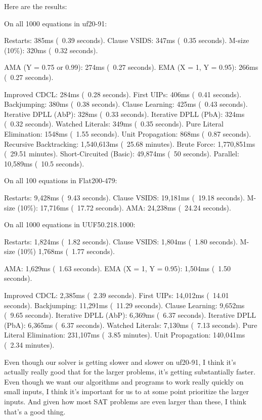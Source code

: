 \documentclass[../main.tex]{subfiles}
\begin{document}
Here are the results:
\begin{FVerbatim}
On all 1000 equations in uf20-91:

Restarts:                   385ms (~0.39 seconds).
Clause VSIDS:               347ms (~0.35 seconds).
M-size (10\%):              320ms (~0.32 seconds).

AMA (Y = 0.75 or 0.99):     274ms (~0.27 seconds).
EMA (X = 1, Y = 0.95):      266ms (~0.27 seconds).

Improved CDCL:              284ms (~0.28 seconds).
First UIPs:                 406ms (~0.41 seconds).
Backjumping:                380ms (~0.38 seconds).
Clause Learning:            425ms (~0.43 seconds).
Iterative DPLL (AbP):       328ms (~0.33 seconds).
Iterative DPLL (PbA):       324ms (~0.32 seconds).
Watched Literals:           349ms (~0.35 seconds).
Pure Literal Elimination:   1548ms (~1.55 seconds).
Unit Propagation:           868ms (~0.87 seconds).
Recursive Backtracking:     1,540,613ms (~25.68 minutes).
Brute Force:                1,770,851ms (~29.51 minutes).
Short-Circuited (Basic):    49,874ms (~50 seconds).
Parallel:                   10,589ms (~10.5 seconds).

On all 100 equations in Flat200-479:

Restarts:                   9,428ms  (~9.43 seconds).
Clause VSIDS:               19,181ms (~19.18 seconds).
M-size (10\%):              17,716ms (~17.72 seconds).
AMA:                        24,238ms (~24.24 seconds).

On all 1000 equations in UUF50.218.1000:

Restarts:                   1,824ms (~1.82 seconds).
Clause VSIDS:               1,804ms (~1.80 seconds).
M-size (10\%)               1,768ms (~1.77 seconds).

AMA:                        1,629ms (~1.63 seconds).
EMA (X = 1, Y = 0.95):      1,504ms (~1.50 seconds).

Improved CDCL:              2,385ms (~2.39 seconds).
First UIPs:                 14,012ms (~14.01 seconds).
Backjumping:                11,291ms (~11.29 seconds).
Clause Learning:            9,652ms (~9.65 seconds).
Iterative DPLL (AbP):       6,369ms (~6.37 seconds).
Iterative DPLL (PbA):       6,365ms (~6.37 seconds).
Watched Literals:           7,130ms (~7.13 seconds).
Pure Literal Elimination:   231,107ms (~3.85 minutes).
Unit Propagation:           140,041ms (~2.34 minutes).
\end{FVerbatim}
\noindent
Even though our solver is getting slower and slower on uf20-91, I think it's
actually really good that for the larger problems, it's getting substantially 
faster. Even though we want our algorithms and programs to work really quickly 
on small inputs, I think it's important for us to at some point prioritize the 
larger inputs. And given how most SAT problems are even larger than these, 
I think that's a good thing. 
\end{document}
